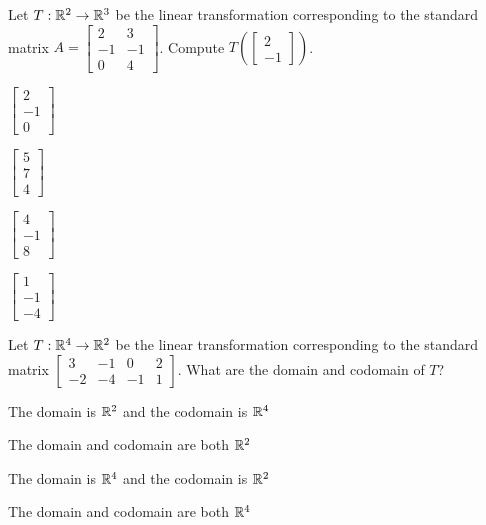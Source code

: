 \begin{readinessAssuranceTest}
\item Let $T: \mathbb{R}^2 \rightarrow \mathbb{R}^3$ be the linear transformation corresponding to the standard matrix $A=\begin{bmatrix} 2 & 3 \\ -1 & -1 \\ 0 & 4 \end{bmatrix}$.  Compute $T\left(\begin{bmatrix} 2 \\ -1 \end{bmatrix}\right)$.
\begin{multicols}{4}
\begin{readinessAssuranceTestChoices}
\item $\begin{bmatrix} 2 \\ -1 \\ 0 \end{bmatrix}$
\item $\begin{bmatrix} 5 \\ 7 \\ 4\end{bmatrix}$
\item $\begin{bmatrix} 4 \\ -1 \\ 8 \end{bmatrix}$
\item $\begin{bmatrix} 1 \\ -1 \\ -4 \end{bmatrix}$ %
\end{readinessAssuranceTestChoices}
\end{multicols}

\newpage
\item Let \(T: \mathbb{R}^4 \rightarrow \mathbb{R}^2\) be the linear transformation corresponding to the standard matrix \(\begin{bmatrix} 3 & -1 & 0 & 2 \\ -2 & -4 & -1 & 1 \end{bmatrix} \).  What are the domain and codomain of \(T\)?
\begin{readinessAssuranceTestChoices}
\item The domain is \(\mathbb{R}^2\) and the codomain is \(\mathbb{R}^4\)
\item The domain and codomain are both \(\mathbb{R}^2\)
\item The domain is \(\mathbb{R}^4\) and the codomain is \(\mathbb{R}^2\) %
\item The domain and codomain are both \(\mathbb{R}^4\)
\end{readinessAssuranceTestChoices}


\end{readinessAssuranceTest}
